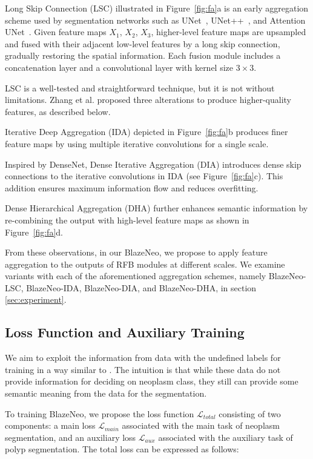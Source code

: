 \documentclass{ieeeaccess}
\newcommand{\ModelName}{BlazeNeo\xspace}
\newcommand{\DHA}{BlazeNeo-DHA\xspace}
\newcommand{\DIA}{BlazeNeo-DIA\xspace}
\newcommand{\IDA}{BlazeNeo-IDA\xspace}
\newcommand{\LSC}{BlazeNeo-LSC\xspace}
\begin{document}
Long Skip Connection (LSC) illustrated in Figure~\ref{fig:fa}a is an early aggregation scheme used by segmentation networks such as UNet~\cite{ronneberger2015u}, UNet++~\cite{zhou2019unet++}, and Attention UNet~\cite{oktay2018attention}. Given feature maps $X_1$, $X_2$, $X_3$, higher-level feature maps are upsampled and fused with their adjacent low-level features by a long skip connection, gradually restoring the spatial information. Each fusion module includes a concatenation layer and a convolutional layer with kernel size $3\times3$.

LSC is a well-tested and straightforward technique, but it is not without limitations. Zhang et al. \cite{zhang2020multi} proposed three alterations to produce higher-quality features, as described below.

Iterative Deep Aggregation (IDA) depicted in Figure~\ref{fig:fa}b produces finer feature maps by using multiple iterative convolutions for a single scale.

Inspired by DenseNet, Dense Iterative Aggregation (DIA) introduces dense skip connections to the iterative convolutions in IDA (see Figure~\ref{fig:fa}c). This addition ensures maximum information flow and reduces overfitting.

Dense Hierarchical Aggregation (DHA) further enhances semantic information by re-combining the output with high-level feature maps as shown in Figure~\ref{fig:fa}d.

From these observations, in our \ModelName, we propose to apply feature aggregation to the outputs of RFB modules at different scales. We examine variants with each of the aforementioned aggregation schemes, namely \LSC, \IDA, \DIA, and \DHA, in section \ref{sec:experiment}.

\subsection{Loss Function and Auxiliary Training}
We aim to exploit the information from data with the undefined labels for training in a way similar to \cite{lan2021neounet}. The intuition is that while these data do not provide
information for deciding on neoplasm class, they still can provide some semantic meaning from the data for the segmentation.


To training \ModelName, we propose the loss function $\mathcal{L}_{total}$ consisting of two components: a main loss $\mathcal{L}_{main}$ associated with the main task of neoplasm segmentation, and an auxiliary loss $\mathcal{L}_{aux}$ associated with the auxiliary task of polyp segmentation. The total loss can be expressed as follows:
\end{document}
